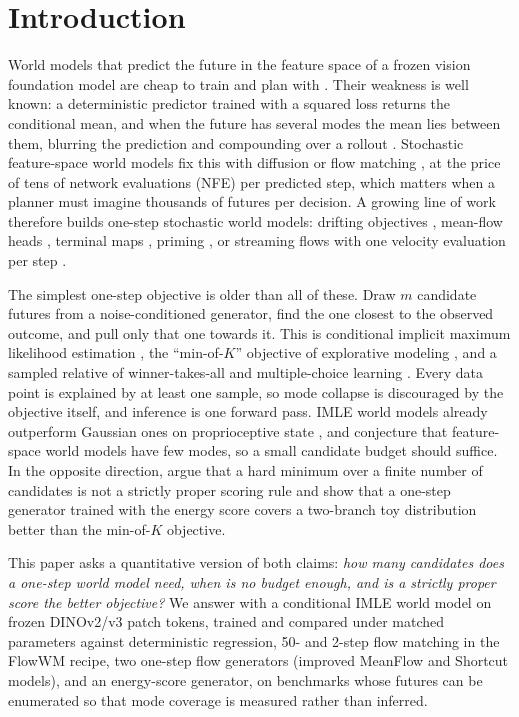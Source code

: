 \section{Introduction}
\label{sec:intro}

World models that predict the future in the feature space of a frozen vision foundation model are cheap to train and plan with \citep{zhou2025dinowm,baldassarre2025dinoworld,assran2025vjepa2}. Their weakness is well known: a deterministic predictor trained with a squared loss returns the conditional mean, and when the future has several modes the mean lies between them, blurring the prediction and compounding over a rollout \citep{porcher2026flowwm,baldassarre2025dinoworld}. Stochastic feature-space world models fix this with diffusion or flow matching \citep{porcher2026flowwm,boduljak2025vfmf,walker2025generalist}, at the price of tens of network evaluations (NFE) per predicted step, which matters when a planner must imagine thousands of futures per decision. A growing line of work therefore builds one-step stochastic world models: drifting objectives \citep{lu2026driftworld}, mean-flow heads \citep{agibot2026geact}, terminal maps \citep{lee2026beckmann}, priming \citep{park2026priming}, or streaming flows with one velocity evaluation per step \citep{hsu2026vsf}.

The simplest one-step objective is older than all of these. Draw $m$ candidate futures from a noise-conditioned generator, find the one closest to the observed outcome, and pull only that one towards it. This is conditional implicit maximum likelihood estimation \citep[IMLE;][]{li2018imle,li2019diverse}, the ``min-of-$K$'' objective of explorative modeling \citep[XM;][]{gladstone2026xm}, and a sampled relative of winner-takes-all and multiple-choice learning \citep{guzman2012mcl,rupprecht2017mhp}. Every data point is explained by at least one sample, so mode collapse is discouraged by the objective itself, and inference is one forward pass. IMLE world models already outperform Gaussian ones on proprioceptive state \citep{aghabozorgi2026wimle}, and \citet{gladstone2026xm} conjecture that feature-space world models have few modes, so a small candidate budget should suffice. In the opposite direction, \citet{makabe2026esp} argue that a hard minimum over a finite number of candidates is not a strictly proper scoring rule and show that a one-step generator trained with the energy score covers a two-branch toy distribution better than the min-of-$K$ objective.

This paper asks a quantitative version of both claims: \emph{how many candidates does a one-step \nom{} world model need, when is no budget enough, and is a strictly proper score the better objective?} We answer with a conditional IMLE world model on frozen DINOv2/v3 patch tokens, trained and compared under matched parameters against deterministic regression, 50- and 2-step flow matching in the FlowWM recipe, two one-step flow generators (improved MeanFlow and Shortcut models), and an energy-score generator, on benchmarks whose futures can be enumerated so that mode coverage is measured rather than inferred.

